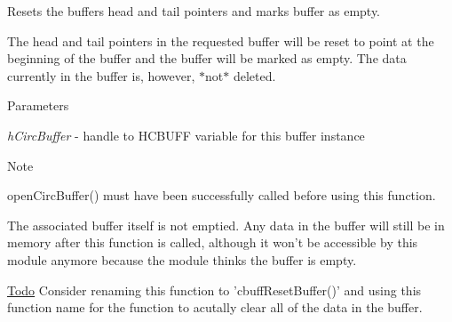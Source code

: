 Resets the buffers head and tail pointers and marks buffer as empty. 

The head and tail pointers in the requested buffer will be reset to point at the beginning of the buffer and the buffer will be marked as empty. The data currently in the buffer is, however, $\ast$not$\ast$ deleted.


\begin{DoxyParams}{Parameters}
\item[{\em hCircBuffer}]-\/ handle to HCBUFF variable for this buffer instance\end{DoxyParams}
\begin{DoxyNote}{Note}

\begin{DoxyEnumerate}
\item openCircBuffer() must have been successfully called before using this function.
\item The associated buffer itself is not emptied. Any data in the buffer will still be in memory after this function is called, although it won't be accessible by this module anymore because the module thinks the buffer is empty.
\end{DoxyEnumerate}
\end{DoxyNote}
\begin{Desc}
\item[\hyperlink{todo__todo000001}{Todo}]Consider renaming this function to 'cbuffResetBuffer()' and using this function name for the function to acutally clear all of the data in the buffer. \end{Desc}
